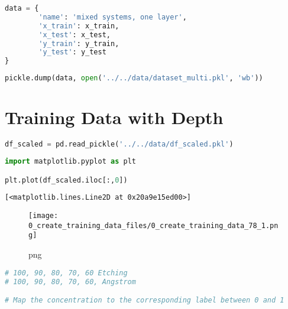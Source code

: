 \begin{lstlisting}[language=Python]
data = {
        'name': 'mixed systems, one layer',
        'x_train': x_train,
        'x_test': x_test,
        'y_train': y_train,
        'y_test': y_test
}
\end{lstlisting}

\begin{lstlisting}[language=Python]
pickle.dump(data, open('../../data/dataset_multi.pkl', 'wb'))
\end{lstlisting}

\hypertarget{training-data-with-depth}{%
\section{Training Data with Depth}\label{training-data-with-depth}}

\begin{lstlisting}[language=Python]
df_scaled = pd.read_pickle('../../data/df_scaled.pkl')
\end{lstlisting}

\begin{lstlisting}[language=Python]
import matplotlib.pyplot as plt

plt.plot(df_scaled.iloc[:,0])
\end{lstlisting}

\begin{lstlisting}
[<matplotlib.lines.Line2D at 0x20a9e15ed00>]
\end{lstlisting}

\begin{figure}
\centering
\texttt{[image: 0\_create\_training\_data\_files/0\_create\_training\_data\_78\_1.png]}
\caption{png}
\end{figure}

\begin{lstlisting}[language=Python]
# 100, 90, 80, 70, 60 Etching
# 100, 90, 80, 70, 60, Angstrom

# Map the concentration to the corresponding label between 0 and 1
\end{lstlisting}

